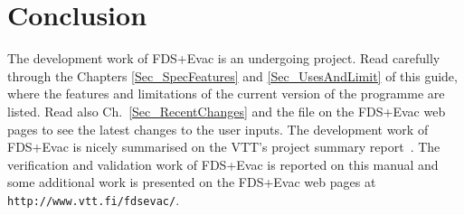 \documentclass[12pt,a4paper,final,twoside]{stylevk}
\begin{document}
\clearpage

\newpage


\chapter{Conclusion}\label{Sec_Conclusions}

\noindent The development work of FDS+Evac is an undergoing project.
Read carefully through the Chapters \ref{Sec_SpecFeatures} and
\ref{Sec_UsesAndLimit} of this guide, where the features and
limitations of the current version of the programme are listed.  Read
also Ch.~\ref{Sec_RecentChanges} and the  file on
the FDS+Evac web pages to see the latest changes to the user inputs.
The development work of FDS+Evac is nicely summarised on the VTT's
project summary report~\cite{Hostikka07a}.  The verification and
validation work of FDS+Evac is reported on this manual and some
additional work is presented on the FDS+Evac web pages at
\texttt{http://www.vtt.fi/fdsevac/}.
\end{document}
